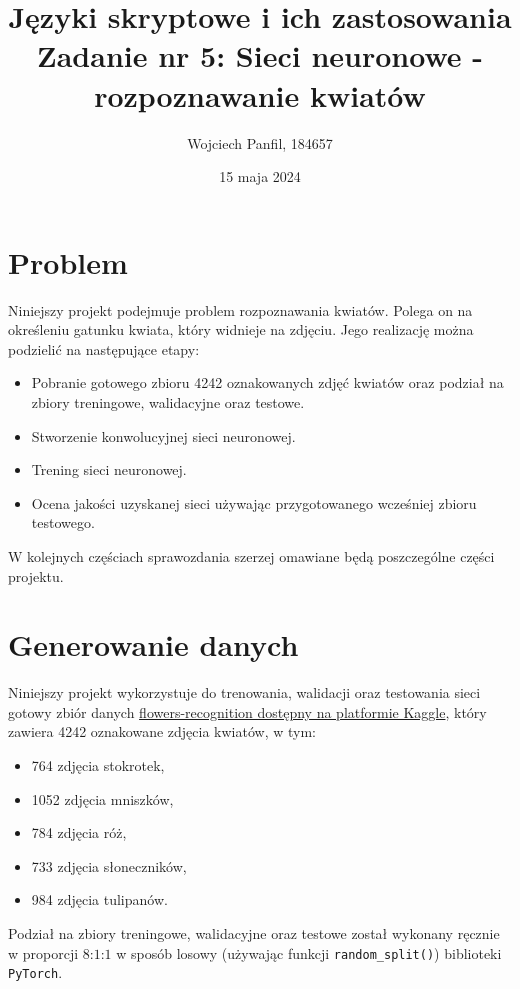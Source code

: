 \documentclass[11pt]{article}
\title{
	\textbf{Języki skryptowe i ich zastosowania}\\
	Zadanie nr 5: Sieci neuronowe - rozpoznawanie kwiatów}
\author{Wojciech Panfil, 184657}
\date{15 maja 2024}
\begin{document}
	\maketitle

	\section{Problem}
	Niniejszy projekt podejmuje problem rozpoznawania kwiatów. Polega on na określeniu
	gatunku kwiata, który widnieje na zdjęciu. Jego realizację można podzielić na następujące etapy:
	\begin{itemize}
		\item Pobranie gotowego zbioru 4242 oznakowanych zdjęć kwiatów oraz podział na zbiory treningowe, walidacyjne oraz testowe.
		\item Stworzenie konwolucyjnej sieci neuronowej.
		\item Trening sieci neuronowej.
		\item Ocena jakości uzyskanej sieci używając przygotowanego wcześniej zbioru testowego.
	\end{itemize}

	W kolejnych częściach sprawozdania szerzej omawiane będą poszczególne części projektu.

	\section{Generowanie danych}
	Niniejszy projekt wykorzystuje do trenowania, walidacji oraz testowania sieci gotowy
	zbiór danych \href{https://www.kaggle.com/datasets/alxmamaev/flowers-recognition}{flowers-recognition dostępny na platformie Kaggle},
	który zawiera 4242 oznakowane zdjęcia kwiatów, w tym:
	\begin{itemize}
		\item 764 zdjęcia stokrotek,
		\item 1052 zdjęcia mniszków,
		\item 784 zdjęcia róż,
		\item 733 zdjęcia słoneczników,
		\item 984 zdjęcia tulipanów.
	\end{itemize}
	Podział na zbiory treningowe, walidacyjne oraz testowe został wykonany ręcznie w proporcji $8$:$1$:$1$ w sposób losowy
	(używając funkcji \texttt{random\_split()}) biblioteki \texttt{PyTorch}.
\end{document}
